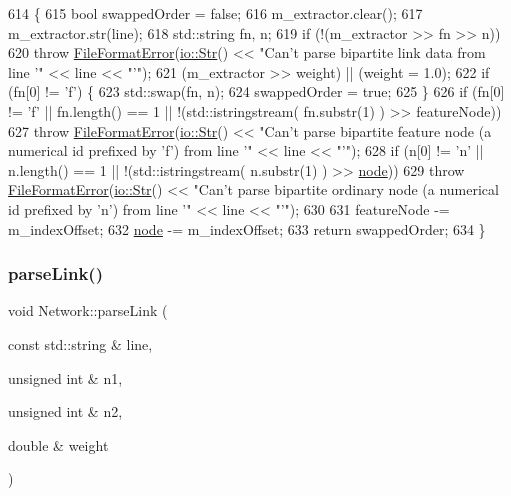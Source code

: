 \begin{DoxyCode}
614 \{
615     \textcolor{keywordtype}{bool} swappedOrder = \textcolor{keyword}{false};
616     m\_extractor.clear();
617     m\_extractor.str(line);
618     std::string fn, n;
619     \textcolor{keywordflow}{if} (!(m\_extractor >> fn >> n))
620         \textcolor{keywordflow}{throw} \mbox{\hyperlink{classFileFormatError}{FileFormatError}}(\mbox{\hyperlink{classio_1_1Str}{io::Str}}() << \textcolor{stringliteral}{"Can't parse bipartite link data from line
       '"} << line << \textcolor{stringliteral}{"'"});
621     (m\_extractor >> weight) || (weight = 1.0);
622     \textcolor{keywordflow}{if} (fn[0] != \textcolor{charliteral}{'f'}) \{
623         std::swap(fn, n);
624         swappedOrder = \textcolor{keyword}{true};
625     \}
626     \textcolor{keywordflow}{if} (fn[0] != \textcolor{charliteral}{'f'} || fn.length() == 1 || !(std::istringstream( fn.substr(1) ) >> featureNode))
627         \textcolor{keywordflow}{throw} \mbox{\hyperlink{classFileFormatError}{FileFormatError}}(\mbox{\hyperlink{classio_1_1Str}{io::Str}}() << \textcolor{stringliteral}{"Can't parse bipartite feature node (a
       numerical id prefixed by 'f') from line '"} << line << \textcolor{stringliteral}{"'"});
628     \textcolor{keywordflow}{if} (n[0] != \textcolor{charliteral}{'n'} || n.length() == 1 || !(std::istringstream( n.substr(1) ) >> 
      \mbox{\hyperlink{structnode}{node}}))
629         \textcolor{keywordflow}{throw} \mbox{\hyperlink{classFileFormatError}{FileFormatError}}(\mbox{\hyperlink{classio_1_1Str}{io::Str}}() << \textcolor{stringliteral}{"Can't parse bipartite ordinary node (a
       numerical id prefixed by 'n') from line '"} << line << \textcolor{stringliteral}{"'"});
630 
631     featureNode -= m\_indexOffset;
632     \mbox{\hyperlink{structnode}{node}} -= m\_indexOffset;
633     \textcolor{keywordflow}{return} swappedOrder;
634 \}
\end{DoxyCode}
\mbox{\label{classNetwork_a06e77b2e70073abda5ef39bdb2e0680a}} 
\subsubsection{\texorpdfstring{parse\+Link()}{parseLink()}}
{\footnotesize\ttfamily void Network\+::parse\+Link (\begin{DoxyParamCaption}\item[{const std\+::string \&}]{line,  }\item[{unsigned int \&}]{n1,  }\item[{unsigned int \&}]{n2,  }\item[{double \&}]{weight }\end{DoxyParamCaption})\hspace{0.3cm}{\ttfamily [protected]}}

